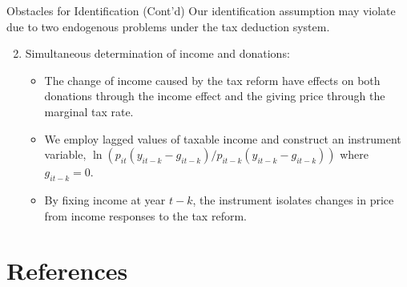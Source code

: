 \documentclass[
  ignorenonframetext,
  aspectratio=169]{beamer}
\providecommand{\tightlist}{%
  \setlength{\itemsep}{0pt}\setlength{\parskip}{0pt}}
\begin{document}
\begin{frame}{Obstacles for Identification (Cont'd)}
\protect\hypertarget{obstacles-for-identification-contd}{}
Our identification assumption may violate due to two endogenous problems under the tax deduction system.

\begin{enumerate}
\setcounter{enumi}{1}
\tightlist
\item
  Simultaneous determination of income and donations:

  \begin{itemize}
  \tightlist
  \item
    The change of income caused by the tax reform have effects on both donations through the income effect and the giving price through the marginal tax rate.
  \item
    We employ lagged values of taxable income and construct an instrument variable, \(\ln (p_{it}(y_{it-k} - g_{it-k})/p_{it-k}(y_{it-k} - g_{it-k}))\) where \(g_{it-k} = 0\).
  \item
    By fixing income at year \(t - k\), the instrument isolates changes in price from income responses to the tax reform.
  \end{itemize}
\end{enumerate}

\clearpage
\end{frame}

\hypertarget{references}{%
\section*{References}\label{references}}
\end{document}
